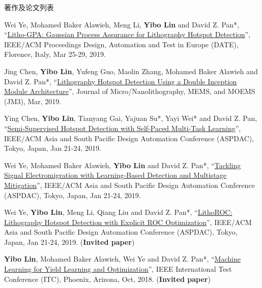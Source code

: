 \begin{rSection}{著作及论文列表}
\begin{description}[font=\normalfont, rightmargin=2em]
{}
            

\item[{[C35]}]{
        Wei Ye, Mohamed Baker Alawieh, Meng Li, \textbf{Yibo Lin} and David Z. Pan*, 
    ``\href{https://doi.org/10.23919/DATE.2019.8714960}{Litho-GPA: Gaussian Process Assurance for Lithography Hotspot Detection}'', 
    IEEE/ACM Proceedings Design, Automation and Test in Europe (DATE), Florence, Italy, Mar 25-29, 2019.
    
}
            

\item[{[J34]}]{
        Jing Chen, \textbf{Yibo Lin}, Yufeng Guo, Maolin Zhang, Mohamed Baker Alawieh and David Z. Pan*, 
    ``\href{https://doi.org/10.1117/1.JMM.18.1.013507}{Lithography Hotspot Detection Using a Double Inception Module Architecture}'', 
    Journal of Micro/Nanolithography, MEMS, and MOEMS (JM3), Mar, 2019.
    
}
            

\item[{[C33]}]{
        Ying Chen, \textbf{Yibo Lin}, Tianyang Gai, Yajuan Su*, Yayi Wei* and David Z. Pan, 
    ``\href{https://doi.org/10.1145/3287624.3287685}{Semi-Supervised Hotspot Detection with Self-Paced Multi-Task Learning}'', 
    IEEE/ACM Asia and South Pacific Design Automation Conference (ASPDAC), Tokyo, Japan, Jan 21-24, 2019.
    
}
            

\item[{[C32]}]{
        Wei Ye, Mohamed Baker Alawieh, \textbf{Yibo Lin} and David Z. Pan*, 
    ``\href{https://doi.org/10.1145/3287624.3287688}{Tackling Signal Electromigration with Learning-Based Detection and Multistage Mitigation}'', 
    IEEE/ACM Asia and South Pacific Design Automation Conference (ASPDAC), Tokyo, Japan, Jan 21-24, 2019.
    
}
            

\item[{[C31]}]{
        Wei Ye, \textbf{Yibo Lin}, Meng Li, Qiang Liu and David Z. Pan*, 
    ``\href{https://doi.org/10.1145/3287624.3288746}{LithoROC: Lithography Hotspot Detection with Explicit ROC Optimization}'', 
    IEEE/ACM Asia and South Pacific Design Automation Conference (ASPDAC), Tokyo, Japan, Jan 21-24, 2019.
    (\textbf{Invited paper})
}
            

\item[{[C30]}]{
        \textbf{Yibo Lin}, Mohamed Baker Alawieh, Wei Ye and David Z. Pan*, 
    ``\href{https://doi.org/10.1109/TEST.2018.8624733}{Machine Learning for Yield Learning and Optimization}'', 
    IEEE International Test Conference (ITC), Phoenix, Arizona, Oct, 2018.
    (\textbf{Invited paper})
}
            


\end{description}
\end{rSection}
